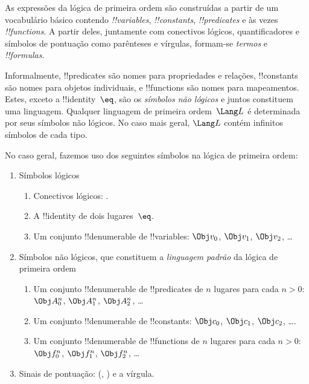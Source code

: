 \documentclass[../../../include/open-logic-section]{subfiles}
\begin{document}



As expressões da lógica de primeira ordem são construídas a partir de um vocabulário básico
contendo \emph{!!{variable}s}, \emph{!!{constant}s},
\emph{!!{predicate}s} e às vezes \emph{!!{function}s}.  A partir deles,
juntamente com conectivos lógicos, quantificadores e símbolos de pontuação
como parênteses e vírgulas, formam-se \emph{termos} e
\emph{!!{formula}s}.

\begin{explain}
Informalmente, !!{predicate}s são nomes para propriedades e relações,
!!{constant}s são nomes para objetos individuais, e !!{function}s são
nomes para mapeamentos.  Estes, exceto a !!{identity}~$\eq$, são os
\emph{símbolos não lógicos} e juntos constituem uma linguagem.  Qualquer
linguagem de primeira ordem~$\Lang L$ é determinada por seus símbolos não
lógicos.  No caso mais geral, $\Lang L$ contém infinitos
símbolos de cada tipo.
\end{explain}

No caso geral, fazemos uso dos seguintes símbolos na
lógica de primeira ordem:

\begin{enumerate}
\item Símbolos lógicos
\begin{enumerate}
\item Conectivos lógicos:
  \startycommalist
  .
\item A !!{identity} de dois lugares~$\eq$.
\item Um conjunto !!{denumerable} de !!{variable}s: $\Obj v_0$, $\Obj v_1$, $\Obj
  v_2$, \dots
\end{enumerate}
\item Símbolos não lógicos, que constituem a \emph{linguagem
  padrão} da lógica de primeira ordem
\begin{enumerate}
\item Um conjunto !!{denumerable} de !!{predicate}s de $n$ lugares para cada $n>0$: $\Obj
  A^n_0$, $\Obj A^n_1$, $\Obj A^n_2$, \dots
\item Um conjunto !!{denumerable} de !!{constant}s: $\Obj c_0$, $\Obj c_1$, $\Obj
  c_2$, \dots.
\item Um conjunto !!{denumerable} de !!{function}s de $n$ lugares para cada $n>0$:
  $\Obj f^n_0$, $\Obj f^n_1$, $\Obj f^n_2$, \dots
\end{enumerate}
\item Sinais de pontuação: (, ) e a vírgula.
\end{enumerate}
\end{document}
